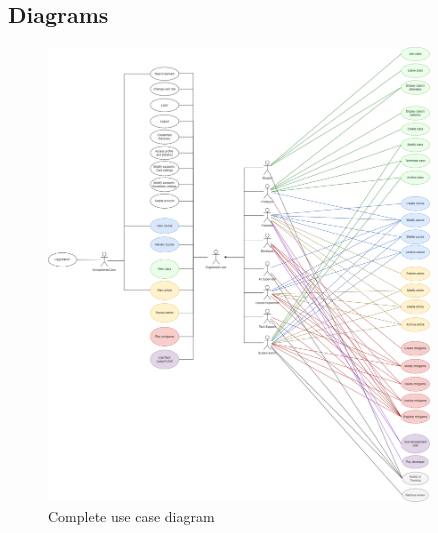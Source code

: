 \newpage
\subsection{Diagrams}
\begin{figure}[h]
	\centering
	\includegraphics[width=0.9\textwidth]{images/usecase-diagram.png}
	\caption{Complete use case diagram}
	\label{fig:usecase-diagram}
\end{figure}

\newpage
